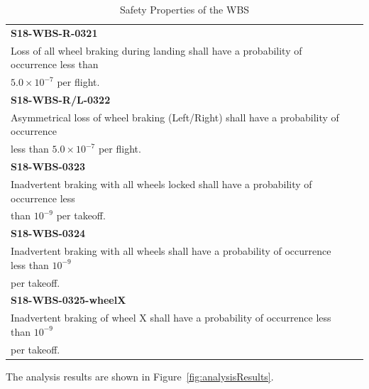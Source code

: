 \begin{table}[htbp]
\begin{center}
\begin{tabular}{@{}ll}
\toprule
\textbf{S18-WBS-R-0321} \\Loss of all wheel braking during landing shall have a probability of occurrence less than \\$5.0 \times 10^{-7}$ per flight.                                    \\ \midrule 
\textbf{S18-WBS-R/L-0322}  \\ Asymmetrical loss of wheel braking (Left/Right) shall have a probability of occurrence\\less than $5.0 \times 10^{-7}$ per flight. \\ \midrule
\textbf{S18-WBS-0323} \\ Inadvertent braking with all wheels locked shall have a probability of occurrence less \\than $10^{-9}$ per takeoff.                                                                                                                                                                                                               \\ \midrule
\textbf{S18-WBS-0324}  \\ Inadvertent braking with all wheels shall have a probability of occurrence less than $10^{-9}$ \\per takeoff.                                                                                                            \\ \midrule
\textbf{S18-WBS-0325-wheelX} \\ Inadvertent braking of wheel X shall have a probability of occurrence less than $10^{-9}$ \\per takeoff.                                                                                                                                                                                                                           \\ \bottomrule
\end{tabular}
\caption{Safety Properties of the WBS}
\label{tab:safetyProperties}
\end{center} 
\end{table} 

The analysis results are shown in Figure~\ref{fig:analysisResults}. 

